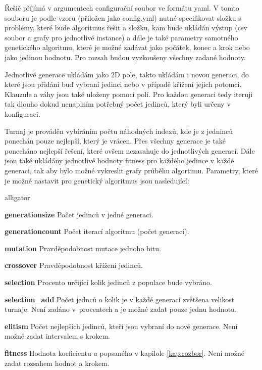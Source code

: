 \documentclass[11pt]{article}
\begin{document}
Řešič příjímá v argumentech configurační soubor ve formátu yaml. V tomto souboru je podle vzoru (přiložen jako config.yml) nutné specifikovat složku s problémy, které bude algoritmus řešit a složku, kam bude ukládán výstup (csv soubor a grafy pro jednotlivé instance) a dále je také parametry samotného genetického algoritmu, které je možné zadávat jako počátek, konec a krok nebo jako jedinou hodnotu. Pro rozsah budou vyzkoušeny všechny zadané hodnoty. 

Jednotlivé generace ukládám jako 2D pole, takto ukládám i novou generaci, do které jsou přidáni buď vybraní jedinci nebo v případě křížení jejich potomci. Klauzule a váhy jsou také uloženy pomocí polí. Pro každou generaci tedy iteruji tak dlouho dokud nenaplním potřebný počet jedinců, který byli určeny v konfiguraci.

Turnaj je prováděn vybíráním počtu náhodných indexů, kde je z jedninců ponechán pouze nejlepší, který je vrácen. Přes všechny generace je také ponecháno nejlepší řešení, které ovšem nezasahuje do jednotlivých generací. Dále jsou také ukládány jednotlivé hodnoty fitness pro každého jedince v každé generaci, tak aby bylo možné vykreslit grafy průběhu algortimu. Parametry, které je možné nastavit pro genetický algoritmus jsou nasledující:

\begin{labeling}{alligator}
\item[\textbf{generationsize}] Počet jedinců v jedné generaci.
\item[\textbf{generationcount}] Počet iterací algoritmu (počet generací).
\item[\textbf{mutation}] Pravděpodobnost mutace jednoho bitu.
\item[\textbf{crossover}] Pravděpodobnost křížení jedinců.
\item[\textbf{selection}] Procento určijící kolik jedinců z populace bude vybráno.
\item[\textbf{selection\_add}] Počet jednců o kolik je v každé generaci zvětšena velikost turnaje. Není zadáno v~procentech a je možné zadat pouze jednu hodnotu.
\item[\textbf{elitism}] Počet nejlepších jedinců, kteří jsou vybraní do nové generace. Není možné zadat intervalem s krokem.
\item[\textbf{fitness}] Hodnota koeficientu $a$ popsaného v kapilole \ref{kap:rozbor}. Není možné zadat rozsahem hodnot a krokem.
\end{labeling}
\end{document}
